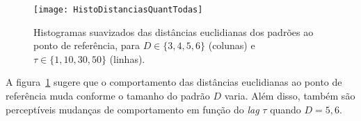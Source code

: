 %
%
%

\begin{figure}[hbt]
\centering
\texttt{[image: HistoDistanciasQuantTodas]}
\caption{Histogramas suavizados das distâncias euclidianas dos padrões ao ponto de referência, para $D\in\{3,4,5,6\}$ (colunas) e $\tau\in\{1,10,30,50\}$ (linhas).}\label{Fig:HistoDistanciasQuantTodas}
\end{figure}

A figura~\ref{Fig:HistoDistanciasQuantTodas} sugere que o comportamento das distâncias euclidianas ao ponto de referência muda conforme o tamanho do padrão $D$ varia.
Além disso, também são perceptíveis mudanças de comportamento em função do \textit{lag} $\tau$ quando $D=5,6$.



